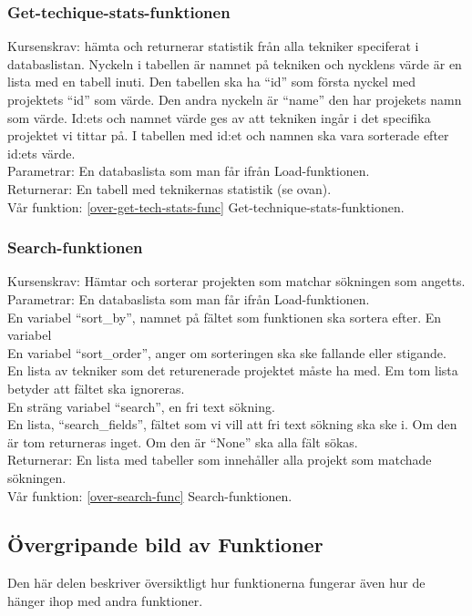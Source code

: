 \documentclass{TDP003mall}
\begin{document}
\subsubsection{Get-techique-stats-funktionen}
Kursenskrav: hämta och returnerar statistik från alla tekniker speciferat i databaslistan. Nyckeln i tabellen är namnet på tekniken och nycklens värde är en lista med en tabell inuti. Den tabellen ska ha ``id'' som första nyckel med projektets ``id'' som värde. Den andra nyckeln är ``name'' den har projekets namn som värde. Id:ets och namnet värde ges av att tekniken ingår i det specifika projektet vi tittar på. I tabellen med id:et och namnen ska vara sorterade efter id:ets värde.\\
\indent Parametrar: En databaslista som man får ifrån Load-funktionen.\\
\indent Returnerar: En tabell med teknikernas statistik (se ovan).\\
Vår funktion: \ref{over-get-tech-stats-func} Get-technique-stats-funktionen.

\subsubsection{Search-funktionen}
Kursenskrav: Hämtar och sorterar projekten som matchar sökningen som angetts.\\
\indent Parametrar: 
\indent \indent En databaslista som man får ifrån Load-funktionen.\\
\indent \indent En variabel ``sort\_by'', namnet på fältet som funktionen ska sortera efter. En variabel\\
\indent \indent En variabel ``sort\_order'', anger om sorteringen ska ske fallande eller stigande.\\
\indent \indent En lista av tekniker som det returenerade projektet måste ha med. Em tom lista betyder att fältet ska ignoreras.\\ 
\indent \indent En sträng variabel ``search'', en fri text sökning.\\
\indent \indent En lista, ``search\_fields'', fältet som vi vill att fri text sökning ska ske i. Om den är tom returneras inget. Om den är ``None'' ska alla fält sökas.\\
\indent Returnerar: En lista med tabeller som innehåller alla projekt som matchade sökningen.\\
Vår funktion: \ref{over-search-func} Search-funktionen.

\subsection{Övergripande bild av Funktioner}
Den här delen beskriver översiktligt hur funktionerna fungerar även hur de hänger ihop med andra funktioner.
\end{document}
